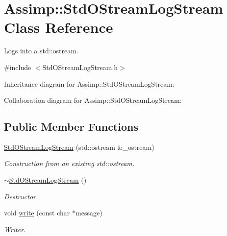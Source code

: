 \hypertarget{class_assimp_1_1_std_o_stream_log_stream}{\section{Assimp\+:\+:Std\+O\+Stream\+Log\+Stream Class Reference}
\label{class_assimp_1_1_std_o_stream_log_stream}
}


Logs into a std\+::ostream.  




{\ttfamily \#include $<$Std\+O\+Stream\+Log\+Stream.\+h$>$}



Inheritance diagram for Assimp\+:\+:Std\+O\+Stream\+Log\+Stream\+:


Collaboration diagram for Assimp\+:\+:Std\+O\+Stream\+Log\+Stream\+:
\subsection*{Public Member Functions}
\begin{DoxyCompactItemize}
\item 
\hyperlink{class_assimp_1_1_std_o_stream_log_stream_a89190d1fe088a327bb304d4f124d3b0f}{Std\+O\+Stream\+Log\+Stream} (std\+::ostream \&\+\_\+ostream)
\begin{DoxyCompactList}\small\item\em Construction from an existing std\+::ostream. \end{DoxyCompactList}\item 
\hypertarget{class_assimp_1_1_std_o_stream_log_stream_a1d353a55fbe3bbea1a1264ab36c7cc55}{\hyperlink{class_assimp_1_1_std_o_stream_log_stream_a1d353a55fbe3bbea1a1264ab36c7cc55}{$\sim$\+Std\+O\+Stream\+Log\+Stream} ()}\label{class_assimp_1_1_std_o_stream_log_stream_a1d353a55fbe3bbea1a1264ab36c7cc55}

\begin{DoxyCompactList}\small\item\em Destructor. \end{DoxyCompactList}\item 
\hypertarget{class_assimp_1_1_std_o_stream_log_stream_a0262ea5e4213b1e126934b367680f95e}{void \hyperlink{class_assimp_1_1_std_o_stream_log_stream_a0262ea5e4213b1e126934b367680f95e}{write} (const char $\ast$message)}\label{class_assimp_1_1_std_o_stream_log_stream_a0262ea5e4213b1e126934b367680f95e}

\begin{DoxyCompactList}\small\item\em Writer. \end{DoxyCompactList}\end{DoxyCompactItemize}
